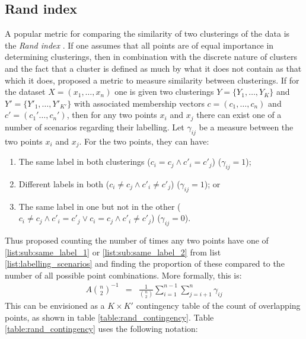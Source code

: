 \documentclass[14pt]{extarticle} %
\begin{document}
	\subsection{Rand index} \label{sec:rand_index}
	A popular metric for comparing the similarity of two clusterings of the data is the \emph{Rand index} \citep{RandObjectiveCriteriaEvaluation1971}. If one assumes that all points are of equal importance in determining clusterings, then in combination with the discrete nature of clusters and the fact that a cluster is defined as much by what it does not contain as that which it does, \citet{RandObjectiveCriteriaEvaluation1971} proposed a metric to measure similarity between clusterings. If for the dataset $X=(x_1,\ldots,x_n)$ one is given two clusterings $Y=\{Y_1,\ldots,Y_{K}\}$ and $Y'=\{Y'_1,\ldots,Y'_{K'}\}$ with associated membership vectors $c=(c_1,\ldots,c_n)$ and $c'=(c_1'\ldots,c_n')$, then for any two points $x_i$ and $x_j$ there can exist one of a number of scenarios regarding their labelling. Let $\gamma_{ij}$ be a measure between the two points $x_i$ and $x_j$. For the two points, they can have:
	\begin{enumerate} \label{list:labelling_scenarios}
		\item The same label in both clusterings ($c_i = c_j \land c'_i = c'_j$) ($\gamma_{ij}=1$); \label{list:sub:same_label_1}
		\item Different labels in both ($c_i \neq c_j \land c'_i \neq c'_j$) ($\gamma_{ij}=1$); or \label{list:sub:same_label_2}
		\item The same label in one but not in the other ($c_i \neq c_j \land c'_i = c'_j \lor c_i = c_j \land c'_i \neq c'_j$) ($\gamma_{ij}=0$). \label{list:sub:different_label}
	\end{enumerate}
	Thus \citet{RandObjectiveCriteriaEvaluation1971} proposed counting the number of times any two points have one of \ref{list:sub:same_label_1} or \ref{list:sub:same_label_2} from list \ref{list:labelling_scenarios} and finding the proportion of these compared to the number of all possible point combinations. More formally, this is:
	\begin{eqnarray} \label{eqn:rand_index}
	A \binom{n}{2}^{-1} & = & \frac{1}{\binom{n}{2}} \sum_{i=1}^{n-1}\sum_{j=i + 1}^n\gamma_{ij} 
	\end{eqnarray}
	This can be envisioned as a $K \times K'$ contingency table of the count of overlapping points, as shown in table \ref{table:rand_contingency}. Table \ref{table:rand_contingency} uses the following notation:
\end{document}
